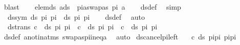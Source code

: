 \begin{isabellebody}
\ blast%
\endisatagproof
{\isafoldproof}%
%
\isadelimproof
\isanewline
%
\endisadelimproof
\isanewline
{}\isamarkupfalse%
\ \isanewline
\ \ elem{\isacharunderscore}{\kern0pt}ds{\isacharcolon}{\kern0pt}\ {\isachardoublequoteopen}{\isasymlbrakk}a{\isasymin}ds\ {\isacharbrackleft}{\kern0pt}{\isacharbrackright}{\kern0pt}\ pi{\isasymrbrakk}{\isasymLongrightarrow}a{\isasymnoteq}swapas\ pi\ a{\isachardoublequoteclose}\isanewline
%
\isadelimproof
\ \ %
\endisadelimproof
%
\isatagproof
{}\isamarkupfalse%
\ ds{\isacharunderscore}{\kern0pt}def\ \isamarkupfalse%
\ simp%
\endisatagproof
{\isafoldproof}%
%
\isadelimproof
\isanewline
%
\endisadelimproof
\isanewline
\isanewline
{}\isamarkupfalse%
\ \isanewline
\ \ ds{\isacharunderscore}{\kern0pt}sym{\isacharcolon}{\kern0pt}\ {\isachardoublequoteopen}ds\ pi{}\ pi{}\ {\isacharequal}{\kern0pt}\ ds\ pi{}\ pi{}{\isachardoublequoteclose}\isanewline
%
\isadelimproof
\ \ %
\endisadelimproof
%
\isatagproof
{}\isamarkupfalse%
\ ds{\isacharunderscore}{\kern0pt}def\ \isamarkupfalse%
\ auto%
\endisatagproof
{\isafoldproof}%
%
\isadelimproof
\isanewline
%
\endisadelimproof
\isanewline
\isanewline
{}\isamarkupfalse%
\ \isanewline
\ \ ds{\isacharunderscore}{\kern0pt}trans{\isacharcolon}{\kern0pt}\ {\isachardoublequoteopen}c\ {\isasymin}\ ds\ pi{}\ pi{}\ {\isasymLongrightarrow}\ {\isacharparenleft}{\kern0pt}c\ {\isasymin}\ ds\ pi{}\ pi{}\ {\isasymor}\ c\ {\isasymin}\ ds\ pi{}\ pi{}{\isacharparenright}{\kern0pt}{\isachardoublequoteclose}\isanewline
%
\isadelimproof
%
\endisadelimproof
%
\isatagproof
{}\isamarkupfalse%
\ ds{\isacharunderscore}{\kern0pt}def\ a{\isacharunderscore}{\kern0pt}not{\isacharunderscore}{\kern0pt}in{\isacharunderscore}{\kern0pt}atms\ swapas{\isacharunderscore}{\kern0pt}pi{\isacharunderscore}{\kern0pt}ineq{\isacharunderscore}{\kern0pt}a\ \isamarkupfalse%
\ auto%
\endisatagproof
{\isafoldproof}%
%
\isadelimproof
\isanewline
%
\endisadelimproof
\isanewline
\isanewline
\isanewline
{}\isamarkupfalse%
\ ds{\isacharunderscore}{\kern0pt}cancel{\isacharunderscore}{\kern0pt}pi{\isacharunderscore}{\kern0pt}left{\isacharcolon}{\kern0pt}\isanewline
\ \ \ {\isachardoublequoteopen}{\isacharparenleft}{\kern0pt}c{\isasymin}\ ds\ {\isacharparenleft}{\kern0pt}pi{}{\isacharat}{\kern0pt}pi{\isacharparenright}{\kern0pt}\ {\isacharparenleft}{\kern0pt}pi{}{\isacharat}{\kern0pt}pi{\isacharparenright}{\kern0pt}{\isacharparenright}{\kern0pt}{\isachardoublequoteclose}\isanewline

\end{isabellebody}
